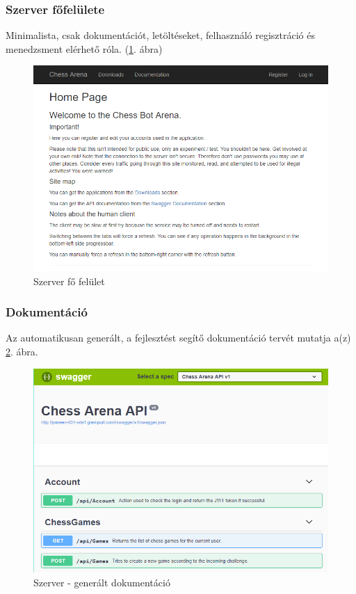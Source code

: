 \documentclass[twoside, a4paper, 12pt]{book}
\begin{document}
\subsubsection{Szerver főfelülete}
Minimalista, csak dokumentációt, letöltéseket, felhasználó regisztráció és menedzsment elérhető róla. (\ref{fig:serverUiMainScreen}. ábra)

\begin{figure}[htbp]
	\centering
	\includegraphics[width=1.0\textwidth]{img/serverUiMainScreen.png}
	\caption{Szerver fő felület}
	\label{fig:serverUiMainScreen}
\end{figure}

\subsubsection{Dokumentáció}
Az automatikusan generált, a fejlesztést segítő dokumentáció tervét mutatja a(z) \ref{fig:serverUiDocumentation}. ábra.

\begin{figure}[htbp]
	\centering
	\includegraphics[width=1.0\textwidth]{img/serverUiDocumentation.png}
	\caption{Szerver - generált dokumentáció}
	\label{fig:serverUiDocumentation}
\end{figure}
\end{document}
